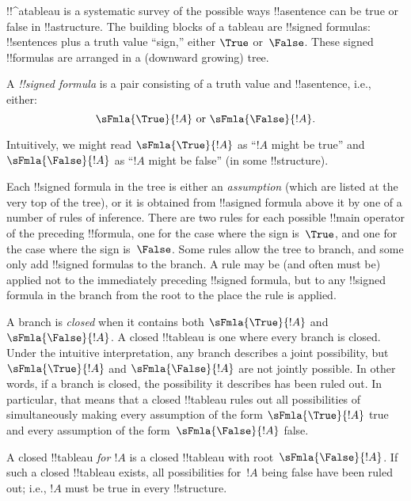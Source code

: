 \documentclass[../../../include/open-logic-section]{subfiles}
\begin{document}
      {}
      {}

!!^a{tableau} is a systematic survey of the possible ways
!!a{sentence} can be true or false in !!a{structure}. The building
blocks of a tableau are !!{signed formula}s: !!{sentence}s plus a
truth value ``sign,'' either $\True$ or~$\False$. These signed
!!{formula}s are arranged in a (downward growing) tree.

\begin{defn}
  A \emph{!!{signed formula}} is a pair consisting of a truth value
  and !!a{sentence}, i.e., either:
  \[
  \sFmla{\True}{!A} \text{ or } \sFmla{\False}{!A}.
  \]
\end{defn}

Intuitively, we might read $\sFmla{\True}{!A}$ as ``$!A$ might be
true'' and $\sFmla{\False}{!A}$ as ``$!A$ might be false'' (in some
!!{structure}).

Each !!{signed formula} in the tree is either an \emph{assumption}
(which are listed at the very top of the tree), or it is obtained from
!!a{signed formula} above it by one of a number of rules of
inference. There are two rules for each possible !!{main operator} of
the preceding !!{formula}, one for the case where the sign is~$\True$,
and one for the case where the sign is~$\False$. Some rules allow the
tree to branch, and some only add !!{signed formula}s to the branch.
A rule may be (and often must be) applied not to the immediately
preceding !!{signed formula}, but to any !!{signed formula} in the
branch from the root to the place the rule is applied.

A branch is \emph{closed} when it contains both $\sFmla{\True}{!A}$
and $\sFmla{\False}{!A}$. A closed !!{tableau} is one where every branch
is closed.  Under the intuitive interpretation, any branch describes a
joint possibility, but $\sFmla{\True}{!A}$ and $\sFmla{\False}{!A}$
are not jointly possible. In other words, if a branch is closed, the
possibility it describes has been ruled out. In particular, that means
that a closed !!{tableau} rules out all possibilities of simultaneously
making every assumption of the form $\sFmla{\True}{!A}$ true and every
assumption of the form~$\sFmla{\False}{!A}$ false.

A closed !!{tableau} \emph{for $!A$} is a closed !!{tableau} with
root~$\sFmla{\False}{!A}$. If such a closed !!{tableau} exists, all
possibilities for~$!A$ being false have been ruled out; i.e., $!A$
must be true in every !!{structure}.
\end{document}
